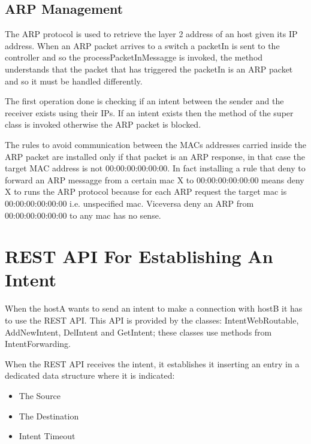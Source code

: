\documentclass[a4paper]{report}
\begin{document}
\subsection{ARP Management}
\noindent The ARP protocol is used to retrieve the layer 2 address of an host given its IP address. When an ARP packet arrives to a switch a packetIn is sent to the controller and so the processPacketInMessagge is invoked, the method understands that the packet that has triggered the packetIn is an ARP packet and so it must be handled differently.


\noindent The first operation done is checking if an intent between the sender and the receiver exists using their IPs. If an intent exists then the method of the super class is invoked otherwise the ARP packet is blocked.


\noindent The rules to avoid communication between the MACs addresses carried inside the ARP packet are installed only if that packet is an ARP response, in that case the target MAC address is not 00:00:00:00:00:00. In fact installing a rule that deny to forward an ARP messagge from a certain mac X to 00:00:00:00:00:00 means deny X to runs the ARP protocol because for each ARP request the target mac is 00:00:00:00:00:00 i.e. unspecified mac. Viceversa deny an ARP from 00:00:00:00:00:00 to any mac has no sense.	
	
	\section{REST API For Establishing An Intent}
	\noindent When the hostA wants to send an intent to make a connection with hostB it has to use the REST API. This API is provided by the classes: IntentWebRoutable, AddNewIntent, DelIntent and GetIntent; these classes use methods from IntentForwarding.
	
	\noindent When the REST API receives the intent, it establishes it inserting an entry in a dedicated data structure where it is indicated:
	\begin{itemize}
	\item The Source
	\item The Destination
	\item Intent Timeout
	\end{itemize}
\end{document}
